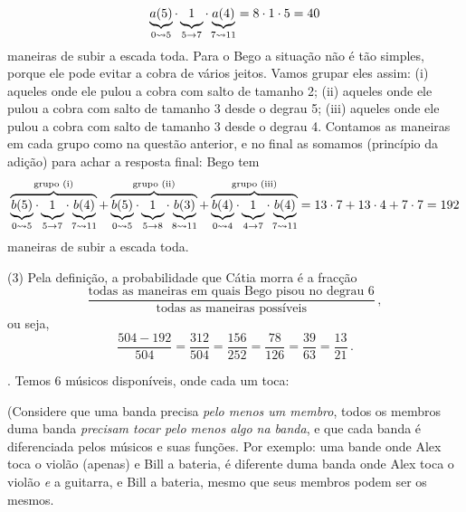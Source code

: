 $$
\underbrace{a(5)}_{0 \transto 5} \ntimes
\underbrace{\phantom(1\phantom)}_{5 \to 7} \ntimes
\underbrace{a(4)}_{7 \transto 11}
=
8 \ntimes 1 \ntimes 5
= 40
$$
maneiras de subir a escada toda.
Para o Bego a situação não é tão simples, porque ele pode evitar a cobra de vários jeitos.
Vamos grupar eles assim:
(i)   aqueles onde ele pulou a cobra com salto de tamanho 2;
(ii)  aqueles onde ele pulou a cobra com salto de tamanho 3 desde o degrau 5;
(iii) aqueles onde ele pulou a cobra com salto de tamanho 3 desde o degrau 4.
Contamos as maneiras em cada grupo como na questão anterior, e no final as somamos (princípio da adição) para achar a resposta final: Bego tem
$$
\overbrace{
\underbrace{b(5)}_{0 \transto 5} \ntimes
\underbrace{\phantom(1\phantom)}_{5 \to 7} \ntimes
\underbrace{b(4)}_{7 \transto 11}
}^{\text{grupo (i)}}
+
\overbrace{
\underbrace{b(5)}_{0 \transto 5} \ntimes
\underbrace{\phantom(1\phantom)}_{5 \to 8} \ntimes
\underbrace{b(3)}_{8 \transto 11}
}^{\text{grupo (ii)}}
+
\overbrace{
\underbrace{b(4)}_{0 \transto 4} \ntimes
\underbrace{\phantom(1\phantom)}_{4 \to 7} \ntimes
\underbrace{b(4)}_{7 \transto 11}
}^{\text{grupo (iii)}}
=
13 \ntimes 7 + 
13 \ntimes 4 + 
7 \ntimes 7 
=
192
$$
maneiras de subir a escada toda.
\item{(3)}
Pela definição, a probabilidade que Cátia morra é a fracção
$$
\frac
{\text{todas as maneiras em quais Bego pisou no degrau 6}}
{\text{todas as maneiras possíveis}}\,,
$$
ou seja,
$$
\frac
{504-192}
{504}
=
\frac
{312}
{504}
=
\frac
{156}
{252}
=
\frac
{78}
{126}
=
\frac
{39}
{63}
=
\frac
{13}
{21}
\,.
$$

\endproblem

\problem.
\label{band_maker}%
Temos $6$ músicos disponíveis, onde cada um toca:
\endgraf
{}

\noindent
(Considere que uma banda precisa \emph{pelo menos um membro},
todos os membros duma banda \emph{precisam tocar pelo menos algo na banda},
e que cada banda é diferenciada pelos músicos e
suas funções.
Por exemplo: uma bande onde Alex toca o violão (apenas) e Bill a bateria,
é diferente duma banda onde
Alex toca o violão \emph{e} a guitarra, e Bill a bateria,
mesmo que seus membros podem ser os mesmos.

